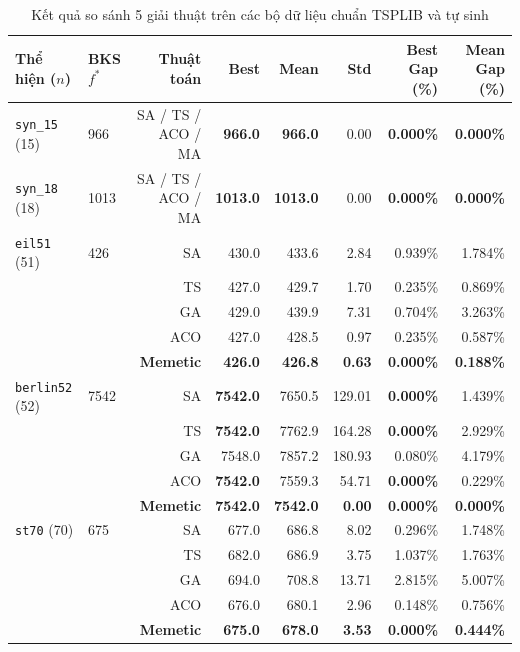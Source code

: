 \documentclass[12pt,a4paper]{report}
\begin{document}
\begin{table}[htbp]
\centering
\caption{Kết quả so sánh 5 giải thuật trên các bộ dữ liệu chuẩn TSPLIB và tự sinh}
\vspace{0.2cm}
\footnotesize
\begin{tabular}{llrrrrrr}
\toprule
\textbf{Thể hiện ($n$)} & \textbf{BKS $f^*$} & \textbf{Thuật toán} & \textbf{Best} & \textbf{Mean} & \textbf{Std} & \textbf{Best Gap (\%)} & \textbf{Mean Gap (\%)} \\
\midrule
\texttt{syn\_15} (15) & 966 & SA / TS / ACO / MA & \textbf{966.0} & \textbf{966.0} & 0.00 & \textbf{0.000\%} & \textbf{0.000\%} \\
\texttt{syn\_18} (18) & 1013 & SA / TS / ACO / MA & \textbf{1013.0} & \textbf{1013.0} & 0.00 & \textbf{0.000\%} & \textbf{0.000\%} \\
\midrule
\texttt{eil51} (51) & 426 & SA & 430.0 & 433.6 & 2.84 & 0.939\% & 1.784\% \\
 & & TS & 427.0 & 429.7 & 1.70 & 0.235\% & 0.869\% \\
 & & GA & 429.0 & 439.9 & 7.31 & 0.704\% & 3.263\% \\
 & & ACO & 427.0 & 428.5 & 0.97 & 0.235\% & 0.587\% \\
 & & \textbf{Memetic} & \textbf{426.0} & \textbf{426.8} & \textbf{0.63} & \textbf{0.000\%} & \textbf{0.188\%} \\
\midrule
\texttt{berlin52} (52) & 7542 & SA & \textbf{7542.0} & 7650.5 & 129.01 & \textbf{0.000\%} & 1.439\% \\
 & & TS & \textbf{7542.0} & 7762.9 & 164.28 & \textbf{0.000\%} & 2.929\% \\
 & & GA & 7548.0 & 7857.2 & 180.93 & 0.080\% & 4.179\% \\
 & & ACO & \textbf{7542.0} & 7559.3 & 54.71 & \textbf{0.000\%} & 0.229\% \\
 & & \textbf{Memetic} & \textbf{7542.0} & \textbf{7542.0} & \textbf{0.00} & \textbf{0.000\%} & \textbf{0.000\%} \\
\midrule
\texttt{st70} (70) & 675 & SA & 677.0 & 686.8 & 8.02 & 0.296\% & 1.748\% \\
 & & TS & 682.0 & 686.9 & 3.75 & 1.037\% & 1.763\% \\
 & & GA & 694.0 & 708.8 & 13.71 & 2.815\% & 5.007\% \\
 & & ACO & 676.0 & 680.1 & 2.96 & 0.148\% & 0.756\% \\
 & & \textbf{Memetic} & \textbf{675.0} & \textbf{678.0} & \textbf{3.53} & \textbf{0.000\%} & \textbf{0.444\%} \\

\end{tabular}
\end{table}
\end{document}

